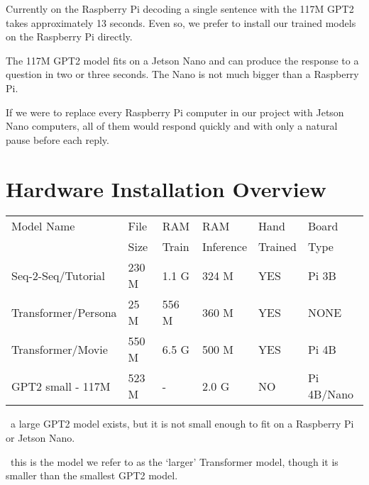 Currently on the Raspberry Pi decoding a single sentence with the 117M GPT2 takes approximately 13 seconds. Even so, we prefer to install our trained models on the Raspberry Pi directly.

The 117M GPT2 model fits on a Jetson Nano and can produce the response to a question in two or three seconds. The Nano is not much bigger than a Raspberry Pi.

If we were to replace every Raspberry Pi computer in our project with Jetson Nano computers, all of them would respond quickly and with only a natural pause before each reply.

\section{Hardware Installation Overview}



\begin{table}[h]
	
	\begin{center}
		
		
		\begin{tabular}{llllll}
			
			Model Name    & File  & RAM  & RAM    & Hand & Board \\
			&  Size & Train   & Inference    & Trained &   Type \\
			\hline
			\hline
			Seq-2-Seq/Tutorial & 230 M     & 1.1 G & 324 M             & YES  &  Pi 3B \\
			Transformer/Persona   & 25 M      & 556 M & 360 M          & YES  & NONE \\
			Transformer/Movie \dag \dag  & 550 M      & 6.5 G & 500 M  & YES    & Pi 4B  \\
			GPT2 small - 117M \dag   & 523 M  & -   & 2.0 G         & NO     &  Pi 4B/Nano \\
			\hline
		\end{tabular}
		
		\bigskip
	\end{center}
		\dag \ a large GPT2 model exists, but it is not small enough to fit on a Raspberry Pi or Jetson Nano.
		
		\dag \dag \ this is the model we refer to as the `larger' Transformer model, though it is smaller than the smallest GPT2 model.
		
	
	\label{fig:modeloverview}
\end{table}


